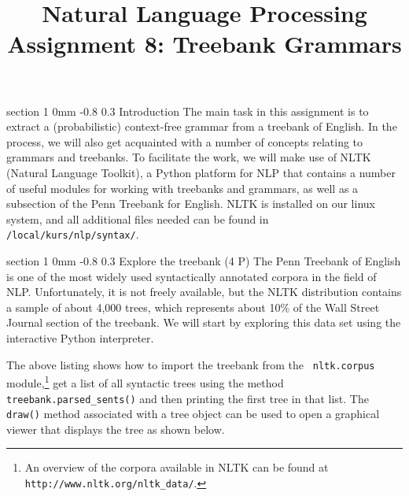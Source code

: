 \documentclass[10.9pt]{article}
\title{{\LARGE Natural Language Processing}\\[1.5mm]{\large Assignment 8: Treebank Grammars}}
\author{}
\date{} %
\makeatletter
\newcommand{\newsec}[2]{\section{#1}\label{sec:#2}\noindent}
\renewcommand{\section}{\@startsection
{section}%
{1}%
{0mm}%
{-0.8\baselineskip}%
{0.3\baselineskip}%
{\bfseries\large}}%
\makeatother
\begin{document}
 

\maketitle
\vspace{-2mm} \newsec{Introduction}{intro}%
The main task in this assignment is to extract a (probabilistic)
context-free grammar from a treebank of English. In the process, we
will also get acquainted with a number of concepts relating to
grammars and treebanks. To facilitate the work, we will make use of
NLTK (Natural Language Toolkit), a Python platform for NLP that
contains a number of useful modules for working with treebanks and
grammars, as well as a subsection of the Penn Treebank for
English. NLTK is installed on our linux system, and all additional
files needed can be found in {\tt /local/kurs/nlp/syntax/}.

\newsec{Explore the treebank (4 P)}{data}%
The Penn Treebank of English is one of the most widely used
syntactically annotated corpora in the field of NLP. Unfortunately, it
is not freely available, but the NLTK distribution contains a sample
of about 4,000 trees, which represents about 10\% of the Wall Street
Journal section of the treebank. We will start by exploring this data
set using the interactive Python interpreter.

\begin{center}
\resizebox{0.8\textwidth}{!}{
\fbox{

}
}
\end{center}
The above listing shows how to import the treebank from the {\tt
  nltk.corpus} module,\footnote{An overview of the corpora available
  in NLTK can be found at {\tt http://www.nltk.org/nltk\_data/}.}  get
a list of all syntactic trees using the method {\tt
  treebank.parsed\_sents()} and then printing the first tree in that
list. The {\tt draw()} method associated with a tree object can be
used to open a graphical viewer that displays the tree as shown below.
\end{document}
